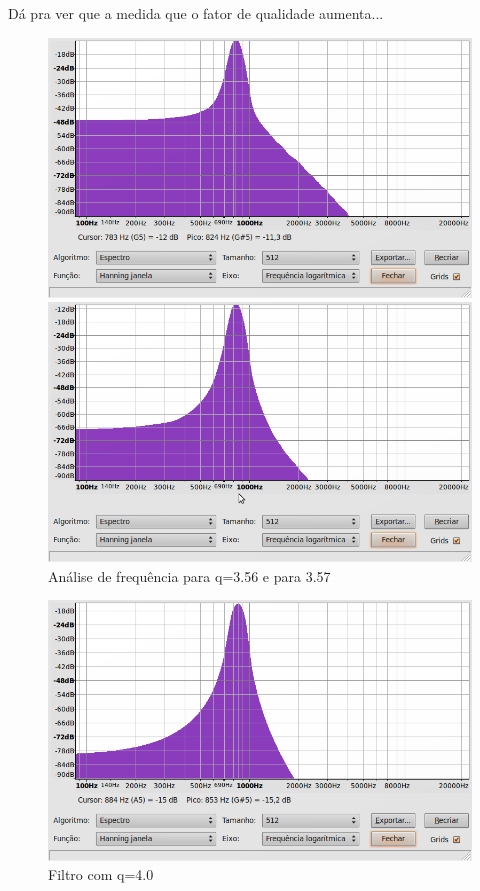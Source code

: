 \documentclass{article}
\begin{document}
Dá pra ver que a medida que o fator de qualidade aumenta...


\begin{figure}
  \centering
\parbox{2in}{
    \centering
    \includegraphics[scale=0.2]{q356.png}
    }%
\qquad	  
\parbox{2in}{
      \centering
      \includegraphics[scale=0.2]{q357.png}
      }%

  \caption{Análise de frequência para q=3.56 e para 3.57}
  \label{fig:qs}
\end{figure}




\begin{figure}
\centering
\includegraphics[scale=0.1]{q4.png}\caption{Filtro com q=4.0}\label{fig:q=4.0}
\end{figure}
\end{document}
